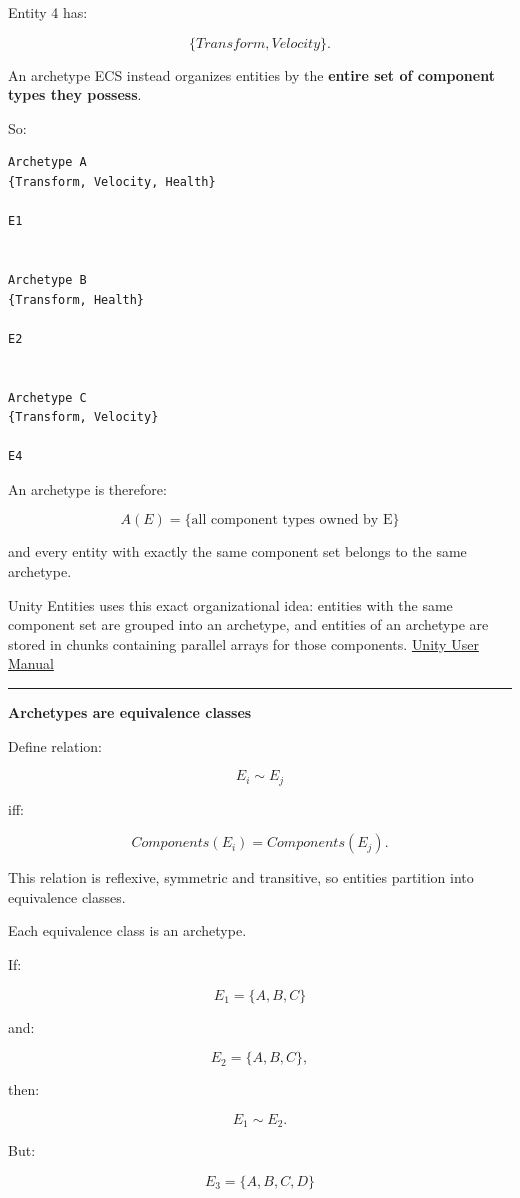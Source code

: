 Entity 4 has:

\[
\{Transform,Velocity\}.
\]

An archetype ECS instead organizes entities by the \textbf{entire set of component types they possess}.

So:

\begin{verbatim}
Archetype A
{Transform, Velocity, Health}

E1


Archetype B
{Transform, Health}

E2


Archetype C
{Transform, Velocity}

E4
\end{verbatim}

An archetype is therefore:

\[
\boxed{
A(E)=
\{\text{all component types owned by E}\}
}
\]

and every entity with exactly the same component set belongs to the same archetype.

Unity Entities uses this exact organizational idea: entities with the same component set are grouped into an archetype, and entities of an archetype are stored in chunks containing parallel arrays for those components. \href{https://docs.unity.cn/Packages/com.unity.entities\%401.0/manual/concepts-archetypes.html?utm_source=chatgpt.com}{Unity User Manual}

\begin{center}\rule{0.5\linewidth}{0.5pt}\end{center}

\textbf{Archetypes are equivalence classes}

Define relation:

\[
E_i\sim E_j
\]

iff:

\[
Components(E_i)=Components(E_j).
\]

This relation is reflexive, symmetric and transitive, so entities partition into equivalence classes.

Each equivalence class is an archetype.

If:

\[
E_1=\{A,B,C\}
\]

and:

\[
E_2=\{A,B,C\},
\]

then:

\[
E_1\sim E_2.
\]

But:

\[
E_3=\{A,B,C,D\}
\]

